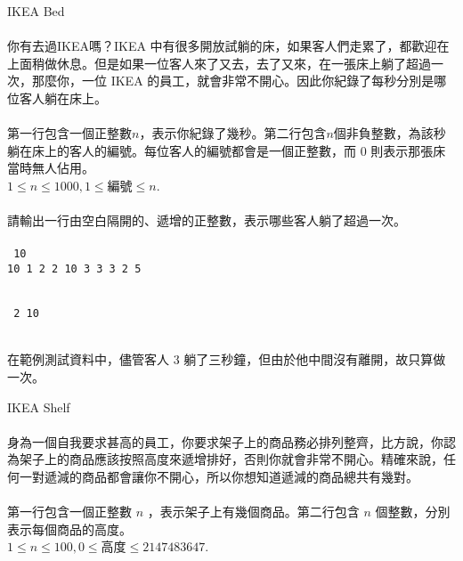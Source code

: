 \documentclass{article}
\begin{document}

{\huge IKEA Bed}\\

\\
    你有去過IKEA嗎？IKEA 中有很多開放試躺的床，如果客人們走累了，都歡迎在上面稍做休息。但是如果一位客人來了又去，去了又來，在一張床上躺了超過一次，那麼你，一位 IKEA 的員工，就會非常不開心。因此你紀錄了每秒分別是哪位客人躺在床上。\\

\\
    第一行包含一個正整數$n$，表示你紀錄了幾秒。第二行包含$n$個非負整數，為該秒躺在床上的客人的編號。每位客人的編號都會是一個正整數，而 $0$ 則表示那張床當時無人佔用。\\
    $1\leq n\leq 1000, 1\leq \text{編號}\leq n$.\\

\\
    請輸出一行由空白隔開的、遞增的正整數，表示哪些客人躺了超過一次。\\

\\
    \texttt{
        10\\
        10 1 2 2 10 3 3 3 2 5\\
    }


\\
    \texttt{
        2 10\\
    }

\\
    在範例測試資料中，儘管客人 3 躺了三秒鐘，但由於他中間沒有離開，故只算做一次。\\
\newpage



{\huge IKEA Shelf}\\

\\
    身為一個自我要求甚高的員工，你要求架子上的商品務必排列整齊，比方說，你認為架子上的商品應該按照高度來遞增排好，否則你就會非常不開心。精確來說，任何一對遞減的商品都會讓你不開心，所以你想知道遞減的商品總共有幾對。\\

\\
    第一行包含一個正整數 $n$ ，表示架子上有幾個商品。第二行包含 $n$ 個整數，分別表示每個商品的高度。\\
    \(1\leq n\leq 100, 0\leq\text{高度}\leq 2147483647\).\\
\end{document}
